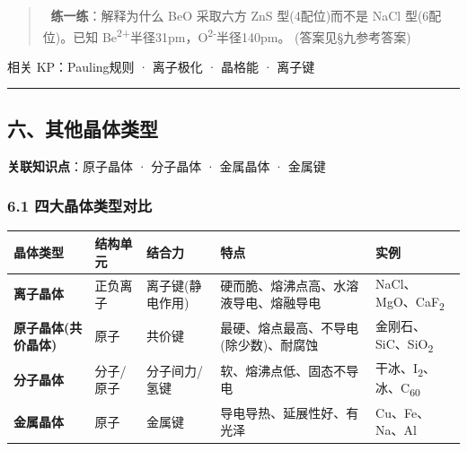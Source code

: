 \begin{quote}
📝 \textbf{练一练}：解释为什么 BeO 采取六方 ZnS 型(4配位)而不是 NaCl 型(6配位)。已知 Be\textsuperscript{2+}半径31pm，O\textsuperscript{2-}半径140pm。
(答案见§九参考答案)
\end{quote}

相关 KP：Pauling规则 · 离子极化 · 晶格能 · 离子键

\begin{center}\rule{0.5\linewidth}{0.5pt}\end{center}

\subsection{六、其他晶体类型}\label{ux516dux5176ux4ed6ux6676ux4f53ux7c7bux578b}

\textbf{关联知识点}：原子晶体 · 分子晶体 · 金属晶体 · 金属键

\subsubsection{6.1 四大晶体类型对比}\label{ux56dbux5927ux6676ux4f53ux7c7bux578bux5bf9ux6bd4}

{\def\LTcaptype{none} %
\begin{longtable}[]{@{}
  >{\raggedright\arraybackslash}p{}
  >{\raggedright\arraybackslash}p{}
  >{\raggedright\arraybackslash}p{}
  >{\raggedright\arraybackslash}p{}
  >{\raggedright\arraybackslash}p{}@{}}
\toprule\noalign{}
\begin{minipage}[b]{\linewidth}\raggedright
晶体类型
\end{minipage} & \begin{minipage}[b]{\linewidth}\raggedright
结构单元
\end{minipage} & \begin{minipage}[b]{\linewidth}\raggedright
结合力
\end{minipage} & \begin{minipage}[b]{\linewidth}\raggedright
特点
\end{minipage} & \begin{minipage}[b]{\linewidth}\raggedright
实例
\end{minipage} \\
\midrule\noalign{}
\endhead
\bottomrule\noalign{}
\endlastfoot
\textbf{离子晶体} & 正负离子 & 离子键(静电作用) & 硬而脆、熔沸点高、水溶液导电、熔融导电 & NaCl、MgO、CaF\textsubscript{2} \\
\textbf{原子晶体(共价晶体)} & 原子 & 共价键 & 最硬、熔点最高、不导电(除少数)、耐腐蚀 & 金刚石、SiC、SiO\textsubscript{2} \\
\textbf{分子晶体} & 分子/原子 & 分子间力/氢键 & 软、熔沸点低、固态不导电 & 干冰、I\textsubscript{2}、冰、C\textsubscript{60} \\
\textbf{金属晶体} & 原子 & 金属键 & 导电导热、延展性好、有光泽 & Cu、Fe、Na、Al \\
\end{longtable}
}

